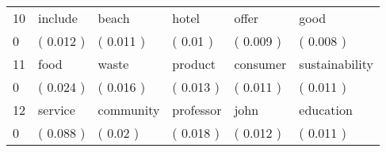 \begin{tabular}{llllll}
10 &    include &        beach &           hotel &      offer &            good \\
0  &  ( 0.012 ) &    ( 0.011 ) &        ( 0.01 ) &  ( 0.009 ) &       ( 0.008 ) \\
11 &       food &        waste &         product &   consumer &  sustainability \\
0  &  ( 0.024 ) &    ( 0.016 ) &       ( 0.013 ) &  ( 0.011 ) &       ( 0.011 ) \\
12 &    service &    community &       professor &       john &       education \\
0  &  ( 0.088 ) &     ( 0.02 ) &       ( 0.018 ) &  ( 0.012 ) &       ( 0.011 ) \\
\bottomrule
\end{tabular}

